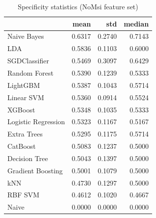 \begin{table}
\caption{Specificity statistics (NoMsi feature set)}
\label{tab:specificity_NoMsi_stats}
\begin{tabular}{lrrr}
\toprule
 & mean & std & median \\
\midrule
Naive Bayes & 0.6317 & 0.2740 & 0.7143 \\
LDA & 0.5836 & 0.1103 & 0.6000 \\
SGDClassifier & 0.5469 & 0.3097 & 0.6429 \\
Random Forest & 0.5390 & 0.1239 & 0.5333 \\
LightGBM & 0.5387 & 0.1043 & 0.5714 \\
Linear SVM & 0.5360 & 0.0914 & 0.5524 \\
XGBoost & 0.5348 & 0.1035 & 0.5333 \\
Logistic Regression & 0.5323 & 0.1167 & 0.5167 \\
Extra Trees & 0.5295 & 0.1175 & 0.5714 \\
CatBoost & 0.5083 & 0.1237 & 0.5000 \\
Decision Tree & 0.5043 & 0.1397 & 0.5000 \\
Gradient Boosting & 0.5001 & 0.1079 & 0.5000 \\
kNN & 0.4730 & 0.1297 & 0.5000 \\
RBF SVM & 0.4612 & 0.1020 & 0.4667 \\
Naive & 0.0000 & 0.0000 & 0.0000 \\
\bottomrule
\end{tabular}
\end{table}
